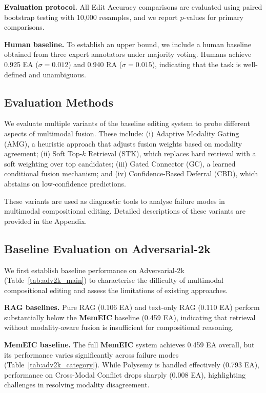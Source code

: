 \documentclass{article}
\newcommand{\memeic}{\textbf{MemEIC}}
\begin{document}
\textbf{Evaluation protocol.} All Edit Accuracy comparisons are evaluated using paired bootstrap testing with 10{,}000 resamples, and we report $p$-values for primary comparisons.

\textbf{Human baseline.} To establish an upper bound, we include a human baseline obtained from three expert annotators under majority voting. Humans achieve 0.925 EA ($\sigma = 0.012$) and 0.940 RA ($\sigma = 0.015$), indicating that the task is well-defined and unambiguous.




\subsection{Evaluation Methods}

We evaluate multiple variants of the baseline editing system to probe different aspects of multimodal fusion. These include: (i) Adaptive Modality Gating (AMG), a heuristic approach that adjusts fusion weights based on modality agreement; (ii) Soft Top-$k$ Retrieval (STK), which replaces hard retrieval with a soft weighting over top candidates; (iii) Gated Connector (GC), a learned conditional fusion mechanism; and (iv) Confidence-Based Deferral (CBD), which abstains on low-confidence predictions.

These variants are used as diagnostic tools to analyse failure modes in multimodal compositional editing. Detailed descriptions of these variants are provided in the Appendix.

\subsection{Baseline Evaluation on Adversarial-2k}
\label{sec:baseline_results}

We first establish baseline performance on Adversarial-2k (Table~\ref{tab:adv2k_main}) to characterise the difficulty of multimodal compositional editing and assess the limitations of existing approaches.

\textbf{RAG baselines.} Pure RAG (0.106 EA) and text-only RAG (0.110 EA) perform substantially below the \memeic{} baseline (0.459 EA), indicating that retrieval without modality-aware fusion is insufficient for compositional reasoning.

\textbf{MemEIC baseline.} The full \memeic{} system achieves 0.459 EA overall, but its performance varies significantly across failure modes (Table~\ref{tab:adv2k_category}). While Polysemy is handled effectively (0.793 EA), performance on Cross-Modal Conflict drops sharply (0.008 EA), highlighting challenges in resolving modality disagreement.
\end{document}
